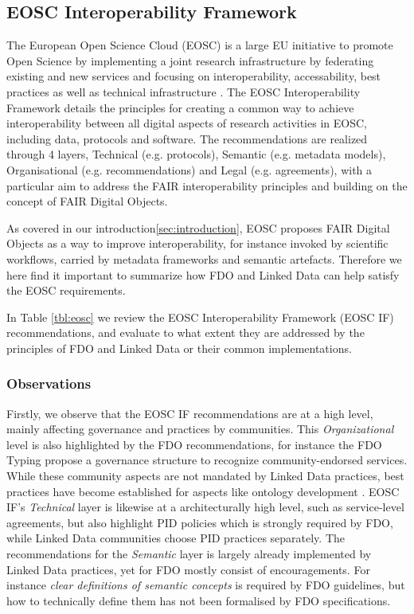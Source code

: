 \documentclass[fleqn,10pt,lineno]{wlpeerjlua}
\begin{document}



\subsection*{EOSC Interoperability Framework}\label{sec:eosc-interoperability-framework}

The European Open Science Cloud (EOSC) is a large EU initiative to promote Open Science by implementing a joint research infrastructure by federating existing and new services and focusing on interoperability, accessability, best practices as well as technical infrastructure \autocite{10.2777/940154}. The EOSC Interoperability Framework \autocite{corchoEOSCInteroperabilityFramework2021b} details the principles for creating a common way to achieve interoperability between all digital aspects of research activities in EOSC, including data, protocols and software. The recommendations are realized through 4 layers, Technical (e.g. protocols), Semantic (e.g. metadata models), Organisational (e.g. recommendations) and Legal (e.g. agreements), with a particular aim to address the FAIR interoperability principles and building on the concept of FAIR Digital Objects. 

As covered in our introduction\vref{sec:introduction}, EOSC proposes FAIR Digital Objects as a way to improve interoperability, for instance invoked by scientific workflows, carried by metadata frameworks and semantic artefacts. Therefore we here find it important to summarize how FDO and Linked Data can help satisfy the EOSC requirements.

In Table \vref{tbl:eosc} we review the EOSC Interoperability Framework (EOSC IF) recommendations, and evaluate to what extent they are addressed by the principles of FDO and Linked Data or their common implementations.

\subsubsection*{Observations}

Firstly, we observe that the EOSC IF recommendations are at a high level, mainly affecting governance and practices by communities. This \emph{Organizational} level is also highlighted by the FDO recommendations, for instance the FDO Typing \autocite{fdo-TypingFDOs} propose a governance structure to recognize community-endorsed services. While these community aspects are not mandated by Linked Data practices, best practices have become established for aspects like ontology development \autocite{10.1186/s13326-021-00240-6}. EOSC IF's \emph{Technical} layer is likewise at a architecturally high level, such as service-level agreements, but also highlight PID policies which is strongly required by FDO, while Linked Data communities choose PID practices separately. The recommendations for the \emph{Semantic} layer is largely already implemented by Linked Data practices, yet for FDO mostly consist of encouragements. For instance \emph{clear definitions of semantic concepts} is required by FDO guidelines, but how to technically define them has not been formalised by FDO specifications. 
\end{document}
